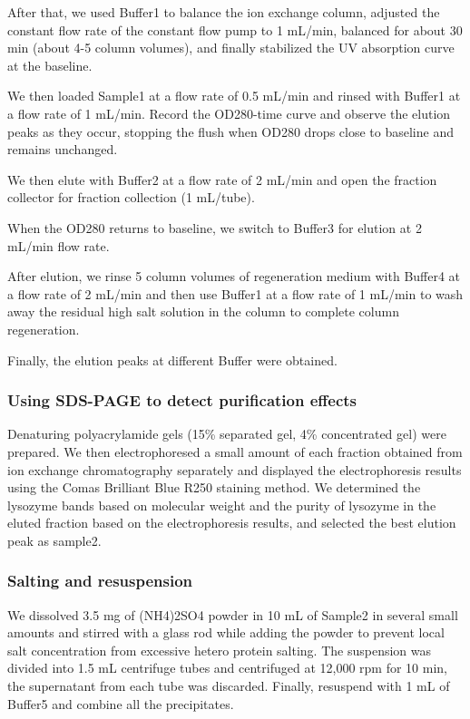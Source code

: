 After that, we used Buffer1 to balance the ion exchange column, adjusted
the constant flow rate of the constant flow pump to 1 mL/min, balanced
for about 30 min (about 4-5 column volumes), and finally stabilized the
UV absorption curve at the baseline.

We then loaded Sample1 at a flow rate of 0.5 mL/min and rinsed with
Buffer1 at a flow rate of 1 mL/min. Record the OD280-time curve and
observe the elution peaks as they occur, stopping the flush when OD280
drops close to baseline and remains unchanged.

We then elute with Buffer2 at a flow rate of 2 mL/min and open the
fraction collector for fraction collection (1 mL/tube).

When the OD280 returns to baseline, we switch to Buffer3 for elution at
2 mL/min flow rate.

After elution, we rinse 5 column volumes of regeneration medium with
Buffer4 at a flow rate of 2 mL/min and then use Buffer1 at a flow rate
of 1 mL/min to wash away the residual high salt solution in the column
to complete column regeneration.

Finally, the elution peaks at different Buffer were obtained.

\subsubsection{Using SDS-PAGE to detect purification effects}

Denaturing polyacrylamide gels (15\% separated gel, 4\% concentrated
gel) were prepared. We then electrophoresed a small amount of each
fraction obtained from ion exchange chromatography separately and
displayed the electrophoresis results using the Comas Brilliant Blue
R250 staining method. We determined the lysozyme bands based on
molecular weight and the purity of lysozyme in the eluted fraction based
on the electrophoresis results, and selected the best elution peak as
sample2.

\subsubsection{Salting and resuspension}

We dissolved 3.5 mg of (NH4)2SO4 powder in 10 mL of Sample2 in several
small amounts and stirred with a glass rod while adding the powder to
prevent local salt concentration from excessive hetero protein salting.
The suspension was divided into 1.5 mL centrifuge tubes and centrifuged
at 12,000 rpm for 10 min, the supernatant from each tube was discarded.
Finally, resuspend with 1 mL of Buffer5 and combine all the
precipitates.

